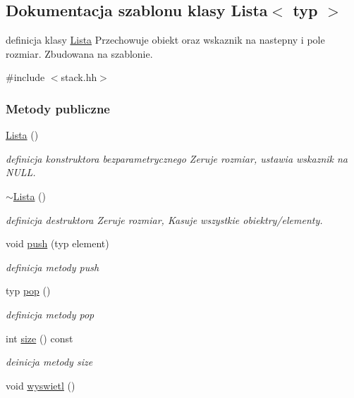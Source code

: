 \hypertarget{class_lista}{}\subsection{Dokumentacja szablonu klasy Lista$<$ typ $>$}
\label{class_lista}


definicja klasy \hyperlink{class_lista}{Lista} Przechowuje obiekt oraz wskaznik na nastepny i pole rozmiar. Zbudowana na szablonie.  




{\ttfamily \#include $<$stack.\+hh$>$}

\subsubsection*{Metody publiczne}
\begin{DoxyCompactItemize}
\item 
\hyperlink{class_lista_a23a5b3313a893057276942e74f330b89}{Lista} ()
\begin{DoxyCompactList}\small\item\em definicja konstruktora bezparametrycznego Zeruje rozmiar, ustawia wskaznik na N\+U\+L\+L. \end{DoxyCompactList}\item 
\hyperlink{class_lista_accc5a3585c7f97372f35f81ef574646e}{$\sim$\+Lista} ()
\begin{DoxyCompactList}\small\item\em definicja destruktora Zeruje rozmiar, Kasuje wszystkie obiektry/elementy. \end{DoxyCompactList}\item 
void \hyperlink{class_lista_afe3d2ff8a9161d30301bfc210287ab51}{push} (typ element)
\begin{DoxyCompactList}\small\item\em definicja metody push \end{DoxyCompactList}\item 
typ \hyperlink{class_lista_a536acf0c981ac359d145da0cc452aadf}{pop} ()
\begin{DoxyCompactList}\small\item\em definicja metody pop \end{DoxyCompactList}\item 
int \hyperlink{class_lista_a8025f28bcc402832d854af6b874451f1}{size} () const 
\begin{DoxyCompactList}\small\item\em deinicja metody size \end{DoxyCompactList}\item 
void \hyperlink{class_lista_ad8055e20d868adabe8c2d8fe73a83395}{wyswietl} ()
\end{DoxyCompactItemize}
